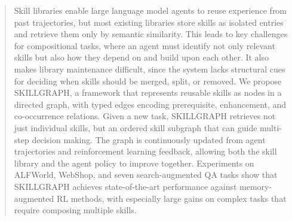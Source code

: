 \begin{abstract}
Skill libraries enable large language model agents to reuse experience from past trajectories, but most existing libraries store skills as isolated entries and retrieve them only by semantic similarity. This leads to key challenges for compositional tasks, where an agent must identify not only relevant skills but also how they depend on and build upon each other. It also makes library maintenance difficult, since the system lacks structural cues for deciding when skills should be merged, split, or removed.
We propose \textsc{SKILLGRAPH}, a framework that represents reusable skills as nodes in a directed graph, with typed edges encoding prerequisite, enhancement, and co-occurrence relations. Given a new task, \textsc{SKILLGRAPH} retrieves not just individual skills, but an ordered skill subgraph that can guide multi-step decision making. The graph is continuously updated from agent trajectories and reinforcement learning feedback, allowing both the skill library and the agent policy to improve together. Experiments on ALFWorld, WebShop, and seven search-augmented QA tasks show that SKILLGRAPH achieves state-of-the-art performance against memory-augmented RL methods, with especially large gains on complex tasks that require composing multiple skills.
\end{abstract}
